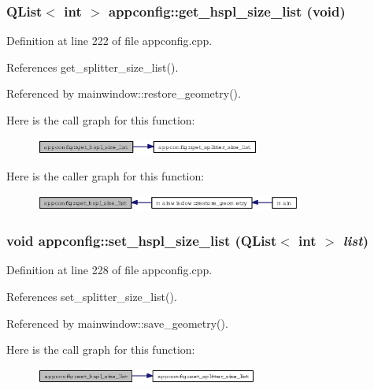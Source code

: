 \subsubsection{\setlength{\rightskip}{0pt plus 5cm}QList$<$ int $>$ appconfig::get\_\-hspl\_\-size\_\-list (void)}\label{classappconfig_9606e4902b9739393279276ada9b0967}




Definition at line 222 of file appconfig.cpp.

References get\_\-splitter\_\-size\_\-list().

Referenced by mainwindow::restore\_\-geometry().

Here is the call graph for this function:\begin{figure}[H]
\begin{center}
\leavevmode
\includegraphics[width=209pt]{classappconfig_9606e4902b9739393279276ada9b0967_cgraph}
\end{center}
\end{figure}


Here is the caller graph for this function:\begin{figure}[H]
\begin{center}
\leavevmode
\includegraphics[width=248pt]{classappconfig_9606e4902b9739393279276ada9b0967_icgraph}
\end{center}
\end{figure}
\subsubsection{\setlength{\rightskip}{0pt plus 5cm}void appconfig::set\_\-hspl\_\-size\_\-list (QList$<$ int $>$ {\em list})}\label{classappconfig_321f62af83196d0409ab5f2f1197de83}




Definition at line 228 of file appconfig.cpp.

References set\_\-splitter\_\-size\_\-list().

Referenced by mainwindow::save\_\-geometry().

Here is the call graph for this function:\begin{figure}[H]
\begin{center}
\leavevmode
\includegraphics[width=207pt]{classappconfig_321f62af83196d0409ab5f2f1197de83_cgraph}
\end{center}
\end{figure}


